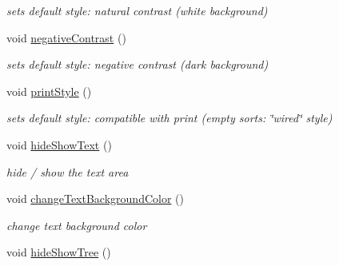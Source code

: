 \begin{DoxyCompactItemize}
\begin{DoxyCompactList}\small\item\em sets default style\+: natural contrast (white background) \end{DoxyCompactList}\item 
\hypertarget{classMainWindow_af24af65044c4d11840848c7e88aee5ab}{void \hyperlink{classMainWindow_af24af65044c4d11840848c7e88aee5ab}{negative\+Contrast} ()}\label{classMainWindow_af24af65044c4d11840848c7e88aee5ab}

\begin{DoxyCompactList}\small\item\em sets default style\+: negative contrast (dark background) \end{DoxyCompactList}\item 
\hypertarget{classMainWindow_acff3aa2177db565ca2e2ced7a70ca46e}{void \hyperlink{classMainWindow_acff3aa2177db565ca2e2ced7a70ca46e}{print\+Style} ()}\label{classMainWindow_acff3aa2177db565ca2e2ced7a70ca46e}

\begin{DoxyCompactList}\small\item\em sets default style\+: compatible with print (empty sorts\+: \char`\"{}wired\char`\"{} style) \end{DoxyCompactList}\item 
\hypertarget{classMainWindow_ad76e17f0b71ff5e14addac21b81551b7}{void \hyperlink{classMainWindow_ad76e17f0b71ff5e14addac21b81551b7}{hide\+Show\+Text} ()}\label{classMainWindow_ad76e17f0b71ff5e14addac21b81551b7}

\begin{DoxyCompactList}\small\item\em hide / show the text area \end{DoxyCompactList}\item 
\hypertarget{classMainWindow_affc0ddbc2bff4b3fab7c95df8ec4322b}{void \hyperlink{classMainWindow_affc0ddbc2bff4b3fab7c95df8ec4322b}{change\+Text\+Background\+Color} ()}\label{classMainWindow_affc0ddbc2bff4b3fab7c95df8ec4322b}

\begin{DoxyCompactList}\small\item\em change text background color \end{DoxyCompactList}\item 
\hypertarget{classMainWindow_ad7f2cca8049e971e9e6cebfff35296e8}{void \hyperlink{classMainWindow_ad7f2cca8049e971e9e6cebfff35296e8}{hide\+Show\+Tree} ()}\label{classMainWindow_ad7f2cca8049e971e9e6cebfff35296e8}


\end{DoxyCompactItemize}

